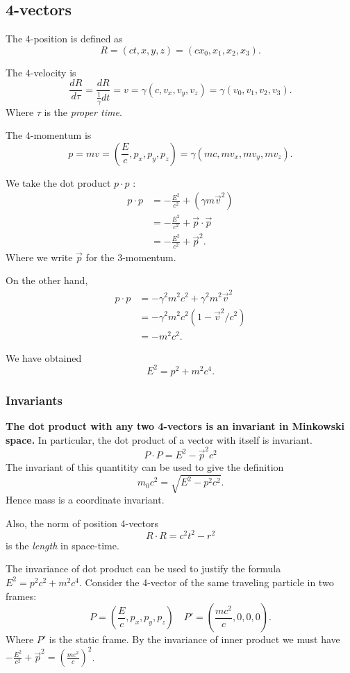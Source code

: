 
\subsection{4-vectors}
The $4$-position is defined as \[
	R = \left( ct, x, y, z \right) 
	= \left( cx_0, x_1, x_2, x_3 \right) 
.\] 

The $4$-velocity is \[
	\frac{dR }{d\tau}= \frac{dR }{\frac{1}{\gamma}dt }= v = \gamma(c, v_x, v_y, v_z) = \gamma(v_0, v_1, v_2, v_3)
.\] 
Where $\tau$ is the \textit{proper time}.

The $4$-momentum is \[
	p = mv = \left( \frac{E}{c}, p_x, p_y, p_z \right)  = \gamma(mc, mv_x, mv_y, mv_z)
.\] 

We take the dot product $p \cdot p$ :
\begin{align*}
	p\cdot p
	&= -\frac{E^2}{c^2} + (\gamma m \vec{v} ^2) \\
	&= -\frac{E^2}{c^2} + \vec{p} \cdot \vec{p} \\
	&= -\frac{E^2}{c^2} + \vec{p}^2
.\end{align*} 
Where we write $\vec{p} $ for the 3-momentum.

On the other hand,
\begin{align*}
	p \cdot p
	&= - \gamma^2 m^2 c^2 + \gamma^2 m^2 \vec{v} ^2 \\
	&= - \gamma^2 m^2 c^2 \left( 1 - \vec{v} ^2 / c^2 \right)  \\
	&= - m^2 c^2
.\end{align*}

We have obtained
\[
	E^2 = p^2 + m^2 c^4
.\] 

\subsubsection{Invariants}

\textbf{The dot product with any two 4-vectors is an invariant in Minkowski space.} In particular, the dot product of a vector with itself is invariant.
\[
	P \cdot P = E^2 - \vec{p} ^2 c^2
\] 
The invariant of this quantitity can be used to give the definition \[
	m_0 c^2 = \sqrt{E^2 - p^2 c^2} 
.\] 
Hence mass is a coordinate invariant.

Also, the norm of position 4-vectors \[
	R \cdot R =  c^2 t^2 - r^2
\] 
is the \textit{length} in space-time.

The invariance of dot product can be used to justify the formula $E^2 = p^2 c^2 + m^2 c^4$. Consider the 4-vector of the same traveling particle in two frames:
\[
	P = \left( \frac{E}{c}, p_x, p_y, p_z \right) \quad P'= \left( \frac{mc^2}{c}, 0, 0, 0 \right) 
.\] 
Where $P'$ is the static frame. By the invariance of inner product we must have $-\frac{E^2}{c^2} + \vec{p} ^2 = (\frac{mc^2}{c})^2 $.


